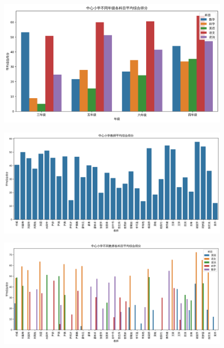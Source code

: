 \documentclass{article}
\begin{document}
\begin{figure}[H]
    \centering
    \includegraphics[width=1\textwidth]{fig/7.png}
\end{figure}

\begin{figure}[H]
    \centering
    \includegraphics[width=1\textwidth]{fig/8.png}
\end{figure}

\begin{figure}[H]
    \centering
    \includegraphics[width=1\textwidth]{fig/9.png}
\end{figure}


% 
% 
\end{document}
